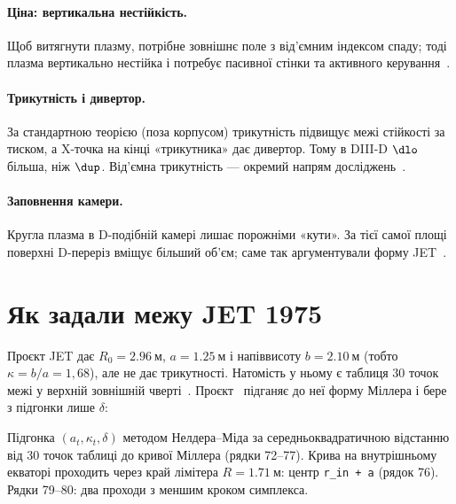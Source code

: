 \paragraph{Ціна: вертикальна нестійкість.} Щоб витягнути плазму, потрібне зовнішнє поле з від'ємним індексом спаду; тоді плазма вертикально нестійка і потребує пасивної стінки та активного керування~\cite[розд.~4]{Manual}.

\paragraph{Трикутність і дивертор.} За стандартною теорією (поза корпусом) трикутність підвищує межі стійкості за тиском, а X-точка на кінці «трикутника» дає дивертор. Тому в DIII-D $\dlo$ більша, ніж $\dup$. Від'ємна трикутність --- окремий напрям досліджень~\cite[розд.~4]{Manual}.

\paragraph{Заповнення камери.} Кругла плазма в D-подібній камері лишає порожніми «кути». За тієї самої площі поверхні D-переріз вміщує більший об'єм; саме так аргументували форму JET~\cite[розд.~5]{Manual}.

\section{Як задали межу JET 1975}\label{sec:geo4-jet}

Проєкт JET дає $R_0=\SI{2,96}{м}$, $a=\SI{1,25}{м}$ і напіввисоту $b=\SI{2,10}{м}$ (тобто $\kappa=b/a=1{,}68$), але не дає трикутності. Натомість у ньому є таблиця 30 точок межі у верхній зовнішній чверті~\cite[с.~332]{JET1975}. Проєкт~\cite{ProjJET} підганяє до неї форму Міллера і бере з підгонки лише $\delta$:


\noindent Підгонка $(a_t,\kappa_t,\delta)$ методом Нелдера--Міда за середньоквадратичною відстанню від 30 точок таблиці до кривої Міллера (рядки 72--77). Крива на внутрішньому екваторі проходить через край лімітера $R=\SI{1,71}{м}$: центр \texttt{r\_in + a} (рядок 76). Рядки 79--80: два проходи з меншим кроком симплекса.


